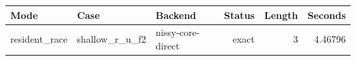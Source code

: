 {\small
\begin{tabular}{lllrrr}
\hline
Mode & Case & Backend & Status & Length & Seconds \\
\hline
resident\_race & shallow\_r\_u\_f2 & nissy-core-direct & exact & 3 & 4.46796 \\
\hline
\end{tabular}
}
